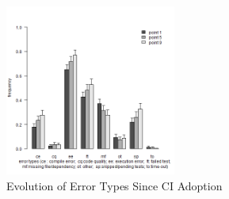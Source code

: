\documentclass[conference]{IEEEtran}
\begin{document}


\begin{figure}[!t]
\centering
\includegraphics[width=0.5\textwidth]{plot_together.png}
\caption{Evolution of Error Types Since CI Adoption}
\label{Fig:BugTypes}
\end{figure}

\balance



\end{document}
